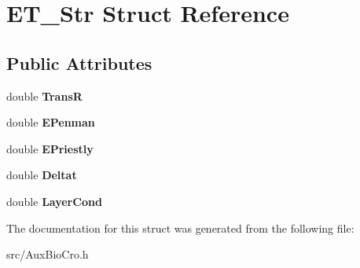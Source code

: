 \hypertarget{struct_e_t___str}{\section{E\-T\-\_\-\-Str Struct Reference}
\label{struct_e_t___str}
}
\subsection*{Public Attributes}
\begin{DoxyCompactItemize}
\item 
\hypertarget{struct_e_t___str_a6459f6ef779feb02861948dc4f4b06f0}{double {\bfseries Trans\-R}}\label{struct_e_t___str_a6459f6ef779feb02861948dc4f4b06f0}

\item 
\hypertarget{struct_e_t___str_a6407d50c376c4982344370729ecb5e95}{double {\bfseries E\-Penman}}\label{struct_e_t___str_a6407d50c376c4982344370729ecb5e95}

\item 
\hypertarget{struct_e_t___str_aa5c251e199215e0ab35a58a8e2a34a32}{double {\bfseries E\-Priestly}}\label{struct_e_t___str_aa5c251e199215e0ab35a58a8e2a34a32}

\item 
\hypertarget{struct_e_t___str_af1313b200fdfaf71c6d4ee070ddeaf8c}{double {\bfseries Deltat}}\label{struct_e_t___str_af1313b200fdfaf71c6d4ee070ddeaf8c}

\item 
\hypertarget{struct_e_t___str_a23fa7f52651a48c6b7054b800a8daa35}{double {\bfseries Layer\-Cond}}\label{struct_e_t___str_a23fa7f52651a48c6b7054b800a8daa35}

\end{DoxyCompactItemize}


The documentation for this struct was generated from the following file\-:\begin{DoxyCompactItemize}
\item 
src/Aux\-Bio\-Cro.\-h\end{DoxyCompactItemize}
